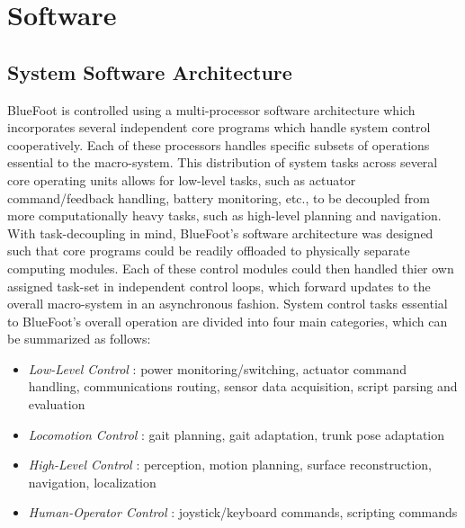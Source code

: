 \label{ch::software}
\chapter{Software}
	
	\section{System Software Architecture}
	
	BlueFoot is controlled using a multi-processor software architecture which incorporates several independent core programs which handle system control cooperatively. Each of these processors handles specific subsets of operations essential to the macro-system. This distribution of system tasks across several core operating units allows for low-level tasks, such as actuator command/feedback handling, battery monitoring, etc., to be decoupled from more computationally heavy tasks, such as high-level planning and navigation. With task-decoupling in mind, BlueFoot's software architecture was designed such that core programs could be readily offloaded to physically separate computing modules. Each of these control modules could then handled thier own assigned task-set in independent control loops, which forward updates to the overall macro-system in an asynchronous fashion. System control tasks essential to BlueFoot's overall operation are divided into four main categories, which can be summarized as follows:
		\begin{itemize}
			\item{
			\emph{Low-Level Control} : 
				power monitoring/switching, 
				actuator command handling, 
				communications routing,
				sensor data acquisition,
				script parsing and evaluation
			}
			\item{
			\emph{Locomotion Control} : 
				gait planning, 
				gait adaptation, 
				trunk pose adaptation
			}
			\item{
			\emph{High-Level Control} : 
				perception, 
				motion planning, 
				surface reconstruction, 
				navigation, 
				localization
			}
			\item{
			\emph{Human-Operator Control} : 
				joystick/keyboard commands,
				scripting commands
			}
		\end{itemize}
